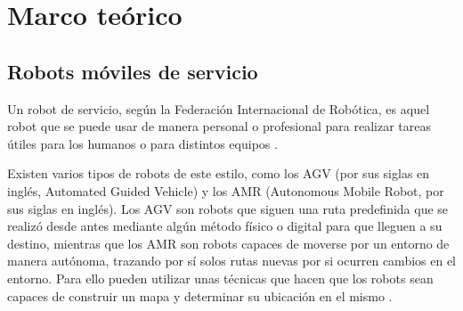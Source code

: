 %
%

\chapter{Marco teórico}
\label{cap:proto-marco-teorico}

%

\section{Robots móviles de servicio}
\label{sec:robot-movil-de-servicio}

Un robot de servicio, según la Federación Internacional de Robótica, es aquel robot que se puede usar de manera personal o profesional para realizar tareas útiles para los humanos o para distintos equipos \cite{MT1}.

Existen varios tipos de robots de este estilo, como los AGV (por sus siglas en inglés, Automated Guided Vehicle) y los AMR (Autonomous Mobile Robot, por sus siglas en inglés). Los AGV son robots que siguen una ruta predefinida que se realizó desde antes mediante algún método físico o digital para que lleguen a su destino, mientras que los AMR son robots capaces de moverse por un entorno de manera autónoma, trazando por sí solos rutas nuevas por si ocurren cambios en el entorno. Para ello pueden utilizar unas técnicas que hacen que los robots sean capaces de construir un mapa y determinar su ubicación en el mismo \cite{MT2}.

